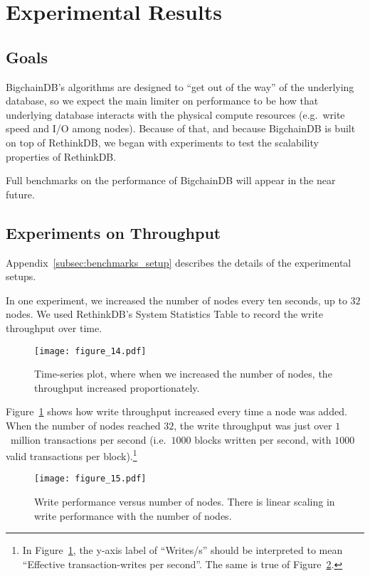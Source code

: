 \section{Experimental Results}\label{sec:benchmarks}

\subsection{Goals}

BigchainDB's algorithms are designed to ``get out of the way'' of the underlying database, so we expect the main limiter on performance to be how that underlying database interacts with the physical compute resources (e.g.~write speed and I/O among nodes).
Because of that, and because BigchainDB is built on top of RethinkDB, we began with experiments to test the scalability properties of RethinkDB.

Full benchmarks on the performance of BigchainDB will appear in the near future.

\subsection{Experiments on Throughput}

Appendix~\ref{subsec:benchmarks_setup} describes the details of the experimental setups.

In one experiment, we increased the number of nodes every ten seconds, up to $32$ nodes.
We used RethinkDB's System Statistics Table to record the write throughput over time.

\begin{figure}[!ht]
  \centering
  \texttt{[image: figure\_14.pdf]}
  \caption{Time-series plot, where when we increased the number of nodes, the throughput increased proportionately.}
  \label{fig:bigchain_throughput_vs_nodes}
\end{figure}

Figure~\ref{fig:bigchain_throughput_vs_nodes} shows how write throughput increased every time a node was added.
When the number of nodes reached $32$, the write throughput was just over $1$~million transactions per second (i.e.~$1000$ blocks written per second, with $1000$ valid transactions per block).\footnote{
In Figure~\ref{fig:bigchain_throughput_vs_nodes}, the y-axis label of ``Writes/s'' should be interpreted to mean ``Effective transaction-writes per second''. The same is true of Figure~\ref{fig:bigchain_writes_vs_nodes}.}

\begin{figure}[!ht]
  \centering
  \texttt{[image: figure\_15.pdf]}
  \caption{Write performance versus number of nodes. There is linear scaling in write performance with the number of nodes.}
  \label{fig:bigchain_writes_vs_nodes}
\end{figure}


